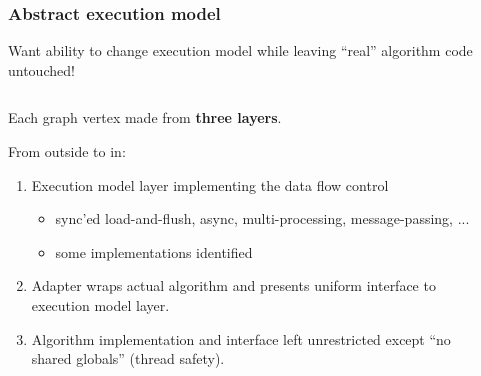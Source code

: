 \begin{frame}
  \frametitle{Abstract execution model}

  \scriptsize Want ability to change execution model while leaving ``real'' algorithm code untouched!

\footnotesize
  
  \begin{columns}
    \begin{column}{0.65\textwidth}
      Each graph vertex made from \textbf{three layers}.\\

      \vspace{2mm}

      From outside to in:
      \begin{enumerate}
      \item Execution model layer implementing the data flow control
        \begin{itemize}\scriptsize
        \item sync'ed load-and-flush, async, multi-processing, message-passing, ...
        \item some implementations identified
        \end{itemize}
      \item Adapter wraps actual algorithm and presents uniform
        interface to execution model layer.
      \item Algorithm implementation and interface left unrestricted
        except ``no shared globals'' (thread safety).
      \end{enumerate}
    \end{column}
    \begin{column}{0.35\textwidth}

\end{column}
\end{columns}
\end{frame}
